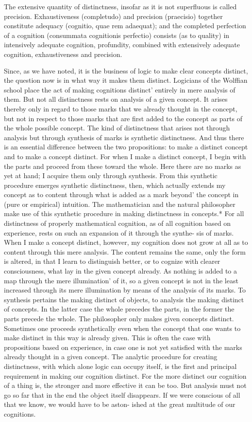 The extensive quantity of distinctness,
insofar as it is not superfluous is called precision.
Exhaustiveness (completudo) and precision (praecisio)
together constitute adequacy (cognitio, quae rem adaequat);
and the completed perfection of a cognition
(consummata cognitionis perfectio) consists (as to quality)
in intensively adequate cognition,
profundity, combined with extensively adequate cognition,
exhaustiveness and precision.

Since, as we have noted, it is the business of logic to make clear concepts
distinct, the question now is in what way it makes them distinct.
Logicians of the Wolffian school place the act of making cognitions
distinct' entirely in mere analysis of them. But not all distinctness rests on
analysis of a given concept. It arises thereby only in regard to those marks
that we already thought in the concept, but not in respect to those marks
that are first added to the concept as parts of the whole possible concept.
The kind of distinctness that arises not through analysis but through
synthesis of marks is synthetic distinctness. And thus there is an essential
difference between the two propositions: to make a distinct concept and to
make a concept distinct.
For when I make a distinct concept, I begin with the parts and proceed
from these toward the whole. Here there are no marks as yet at hand; I
acquire them only through synthesis. From this synthetic procedure
emerges synthetic distinctness, then, which actually extends my concept
as to content through what is added as a mark beyond' the concept in (pure
or empirical) intuition. The mathematician and the natural philosopher
make use of this synthetic procedure in making distinctness in concepts.*
For all distinctness of properly mathematical cognition, as of all cognition
based on experience, rests on such an expansion of it through the synthe-
sis of marks.
When I make a concept distinct, however, my cognition does not grow
at all as to content through this mere analysis. The content remains the
same, only the form is altered, in that I learn to distinguish better, or to
cognize with clearer consciousness, what lay in the given concept already.
As nothing is added to a map through the mere illumination' of it, so a
given concept is not in the least increased through its mere illumination
by means of the analysis of its marks.
To synthesis pertains the making distinct of objects, to analysis the
making distinct of concepts. In the latter case the whole precedes the parts,
in the former the parts precede the whole. The philosopher only makes given
concepts distinct.
Sometimes one proceeds synthetically even when the
concept that one wants to make distinct in this way is already given.
This is often the case with propositions based on experience,
in case one is not yet satisfied with
the marks already thought in a given concept.
The analytic procedure for creating distinctness, with which alone logic
can occupy itself, is the first and principal requirement in making our
cognition distinct.
For the more distinct our cognition of a thing is, the
stronger and more effective it can be too.
But analysis must not go so far
that in the end the object itself disappears.
If we were conscious of all that we know, we would have to be aston-
ished at the great multitude of our cognitions.

